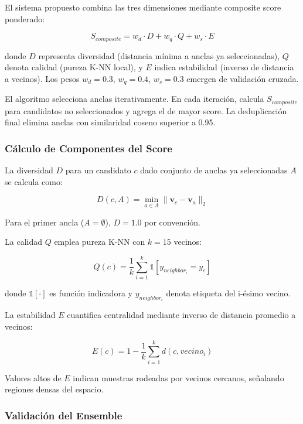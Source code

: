 El sistema propuesto combina las tres dimensiones mediante composite score ponderado:

\begin{equation}
S_{composite} = w_d \cdot D + w_q \cdot Q + w_s \cdot E
\label{eq:composite_score}
\end{equation}

donde $D$ representa diversidad (distancia mínima a anclas ya seleccionadas), $Q$ denota calidad (pureza K-NN local), y $E$ indica estabilidad (inverso de distancia a vecinos). Los pesos $w_d=0.3$, $w_q=0.4$, $w_s=0.3$ emergen de validación cruzada.

El algoritmo selecciona anclas iterativamente. En cada iteración, calcula $S_{composite}$ para candidatos no seleccionados y agrega el de mayor score. La deduplicación final elimina anclas con similaridad coseno superior a 0.95.

\subsubsection*{Cálculo de Componentes del Score}

La diversidad $D$ para un candidato $c$ dado conjunto de anclas ya seleccionadas $A$ se calcula como:

\begin{equation}
D(c, A) = \min_{a \in A} \| \mathbf{v}_c - \mathbf{v}_a \|_2
\end{equation}

Para el primer ancla ($A = \emptyset$), $D = 1.0$ por convención.

La calidad $Q$ emplea pureza K-NN con $k=15$ vecinos:

\begin{equation}
Q(c) = \frac{1}{k} \sum_{i=1}^{k} \mathbb{1}[y_{neighbor_i} = y_c]
\end{equation}

donde $\mathbb{1}[\cdot]$ es función indicadora y $y_{neighbor_i}$ denota etiqueta del i-ésimo vecino.

La estabilidad $E$ cuantifica centralidad mediante inverso de distancia promedio a vecinos:

\begin{equation}
E(c) = 1 - \frac{1}{k} \sum_{i=1}^{k} d(c, vecino_i)
\end{equation}

Valores altos de $E$ indican muestras rodeadas por vecinos cercanos, señalando regiones densas del espacio.

\subsubsection*{Validación del Ensemble}

